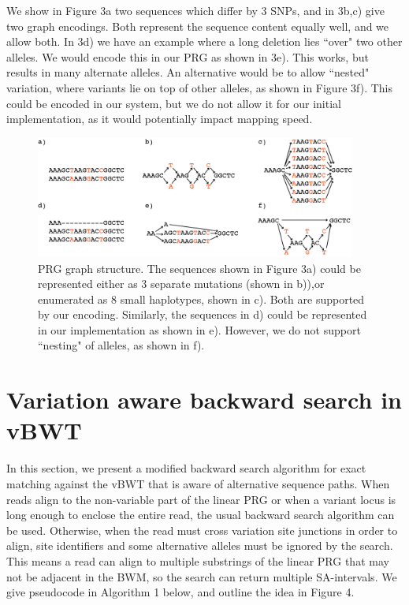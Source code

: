 \documentclass[runningheads,a4paper]{llncs}
\begin{document}
We show in Figure 3a two sequences which differ by 3 SNPs, and in 3b,c) give two graph encodings. Both represent the sequence content equally well, and we allow both.
In 3d) we have an example where a long deletion lies ``over" two other alleles. We would encode this in our PRG as shown in 3e). This works, but results in many alternate alleles. An alternative would be to allow ``nested" variation, where variants lie on top of other alleles, as shown in Figure 3f). This could be encoded in our system, but we do not allow it for our initial implementation, as it would potentially impact mapping speed. 

\begin{figure}
\centering
\includegraphics[height=4cm]{graph_construction.png}
\caption{PRG graph structure. The sequences shown in Figure 3a) could be represented either as 3 separate mutations (shown in b)),or enumerated as 8 small haplotypes, shown in c). Both are supported by our encoding. Similarly, the sequences in d) could be represented in our implementation as shown in e). However, we do not support ``nesting" of alleles, as shown in f).}
\label{lab}
\end{figure}






\section{Variation aware backward search in vBWT}

In this section, we present a modified backward search algorithm for exact matching against the vBWT that is aware of alternative sequence paths. When reads align to the non-variable part of the linear PRG or when a variant locus is long enough to enclose the entire read, the usual backward search algorithm can be used. Otherwise, when the read must cross variation site junctions in order to align, site identifiers and some alternative alleles must be ignored by the search. This means a read can align to multiple substrings of the linear PRG that may not be adjacent in the BWM, so the search can return multiple SA-intervals. We give pseudocode in Algorithm 1 below, and outline the idea in Figure 4.
\end{document}
